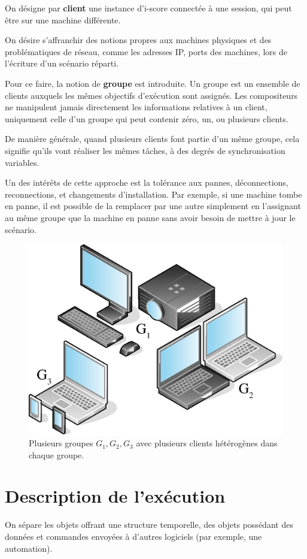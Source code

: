 \documentclass{article}
\newcommand\vocab[1]{\textbf{#1}}
\begin{document}
On désigne par \vocab{client} une instance d'i-score connectée à une session, qui peut être sur une machine différente.

On désire s'affranchir des notions propres aux machines physiques et des problématiques de réseau, comme les adresses IP, ports des machines, lors de l'écriture d'un scénario réparti. 

Pour ce faire, la notion de \vocab{groupe} est introduite. 
Un groupe est un ensemble de clients auxquels les mêmes objectifs d'exécution sont assignés.
Les compositeurs ne manipulent jamais directement les informations relatives à un client, uniquement celle d'un groupe qui peut contenir zéro, un, ou plusieurs clients.

De manière générale, quand plusieurs clients font partie d'un même groupe, cela signifie qu'ils vont réaliser les mêmes tâches, à des degrés de synchronisation variables.

Un des intérêts de cette approche est la tolérance aux pannes, déconnections, reconnections, et changements d'installation. 
Par exemple, si une machine tombe en panne, il est possible de la remplacer par une autre simplement en l'assignant au même groupe que la machine en panne 
sans avoir besoin de mettre à jour le scénario.


\begin{figure}[h]
	\centering
	\includegraphics[scale=0.4]{images/groupes.eps}
	\caption{Plusieurs groupes $G_1,G_2,G_3$ avec plusieurs clients hétérogènes dans chaque groupe.}
	\label{img.groupes}
\end{figure}


\section{Description de l'exécution}\label{sec.description}
On sépare les objets offrant une structure temporelle, des objets possédant des données et commandes envoyées à d'autres logiciels (par exemple, une automation).
\end{document}
